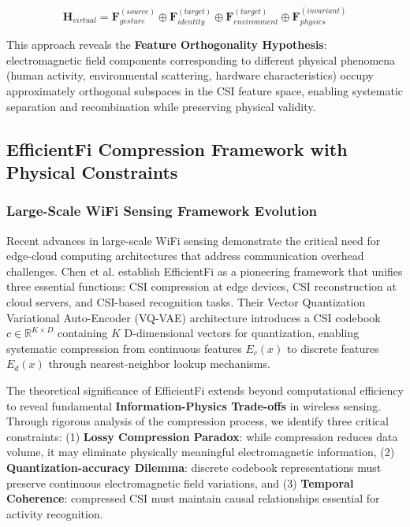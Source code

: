 \documentclass[journal]{IEEEtran}
\begin{document}
\begin{equation}
\mathbf{H}_{virtual} = \mathbf{F}_{gesture}^{(source)} \oplus \mathbf{F}_{identity}^{(target)} \oplus \mathbf{F}_{environment}^{(target)} \oplus \mathbf{F}_{physics}^{(invariant)}
\label{eq:virtual_sample_generation}
\end{equation}

This approach reveals the \textbf{Feature Orthogonality Hypothesis}: electromagnetic field components corresponding to different physical phenomena (human activity, environmental scattering, hardware characteristics) occupy approximately orthogonal subspaces in the CSI feature space, enabling systematic separation and recombination while preserving physical validity.

\subsection{EfficientFi Compression Framework with Physical Constraints}

\subsubsection{Large-Scale WiFi Sensing Framework Evolution}

Recent advances in large-scale WiFi sensing demonstrate the critical need for edge-cloud computing architectures that address communication overhead challenges. Chen et al. \cite{chen2024efficientfi} establish EfficientFi as a pioneering framework that unifies three essential functions: CSI compression at edge devices, CSI reconstruction at cloud servers, and CSI-based recognition tasks. Their Vector Quantization Variational Auto-Encoder (VQ-VAE) architecture introduces a CSI codebook $c \in \mathbb{R}^{K \times D}$ containing $K$ D-dimensional vectors for quantization, enabling systematic compression from continuous features $E_c(x)$ to discrete features $E_d(x)$ through nearest-neighbor lookup mechanisms.

The theoretical significance of EfficientFi extends beyond computational efficiency to reveal fundamental \textbf{Information-Physics Trade-offs} in wireless sensing. Through rigorous analysis of the compression process, we identify three critical constraints: (1) \textbf{Lossy Compression Paradox}: while compression reduces data volume, it may eliminate physically meaningful electromagnetic information, (2) \textbf{Quantization-accuracy Dilemma}: discrete codebook representations must preserve continuous electromagnetic field variations, and (3) \textbf{Temporal Coherence}: compressed CSI must maintain causal relationships essential for activity recognition.
\end{document}
